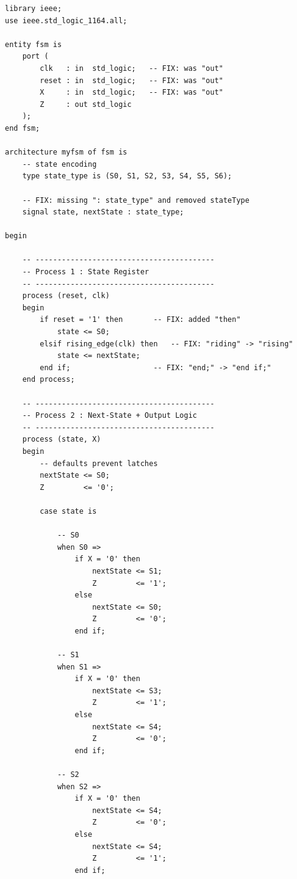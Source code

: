 \documentclass[12pt,a4paper]{article}
\begin{document}
\begin{tcolorbox}[vhdlbox, title={fsm.vhd --- Corrected}]
\begin{lstlisting}[style=vhdlstyle]
library ieee;
use ieee.std_logic_1164.all;

entity fsm is
    port (
        clk   : in  std_logic;   -- FIX: was "out"
        reset : in  std_logic;   -- FIX: was "out"
        X     : in  std_logic;   -- FIX: was "out"
        Z     : out std_logic
    );
end fsm;

architecture myfsm of fsm is
    -- state encoding
    type state_type is (S0, S1, S2, S3, S4, S5, S6);

    -- FIX: missing ": state_type" and removed stateType
    signal state, nextState : state_type;

begin

    -- -----------------------------------------
    -- Process 1 : State Register
    -- -----------------------------------------
    process (reset, clk)
    begin
        if reset = '1' then       -- FIX: added "then"
            state <= S0;
        elsif rising_edge(clk) then   -- FIX: "riding" -> "rising"
            state <= nextState;
        end if;                   -- FIX: "end;" -> "end if;"
    end process;

    -- -----------------------------------------
    -- Process 2 : Next-State + Output Logic
    -- -----------------------------------------
    process (state, X)
    begin
        -- defaults prevent latches
        nextState <= S0;
        Z         <= '0';

        case state is

            -- S0
            when S0 =>
                if X = '0' then
                    nextState <= S1;
                    Z         <= '1';
                else
                    nextState <= S0;
                    Z         <= '0';
                end if;

            -- S1
            when S1 =>
                if X = '0' then
                    nextState <= S3;
                    Z         <= '1';
                else
                    nextState <= S4;
                    Z         <= '0';
                end if;

            -- S2
            when S2 =>
                if X = '0' then
                    nextState <= S4;
                    Z         <= '0';
                else
                    nextState <= S4;
                    Z         <= '1';
                end if;


\end{lstlisting}
\end{tcolorbox}
\end{document}
